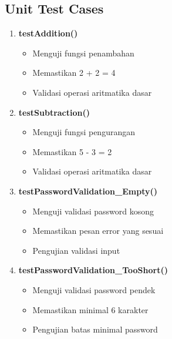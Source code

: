 \documentclass[12pt,a4paper]{article}
\begin{document}
\subsection{Unit Test Cases}
\begin{enumerate}
    \item \textbf{testAddition()}
    \begin{itemize}
        \item Menguji fungsi penambahan
        \item Memastikan 2 + 2 = 4
        \item Validasi operasi aritmatika dasar
    \end{itemize}
    
    \item \textbf{testSubtraction()}
    \begin{itemize}
        \item Menguji fungsi pengurangan
        \item Memastikan 5 - 3 = 2
        \item Validasi operasi aritmatika dasar
    \end{itemize}
    
    \item \textbf{testPasswordValidation\_Empty()}
    \begin{itemize}
        \item Menguji validasi password kosong
        \item Memastikan pesan error yang sesuai
        \item Pengujian validasi input
    \end{itemize}
    
    \item \textbf{testPasswordValidation\_TooShort()}
    \begin{itemize}
        \item Menguji validasi password pendek
        \item Memastikan minimal 6 karakter
        \item Pengujian batas minimal password
    \end{itemize}
\end{enumerate}
\end{document}

